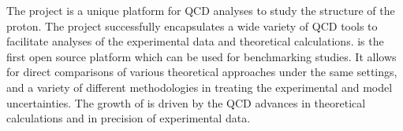 
\label{sec:summary}
The \fitter project is a unique platform for QCD analyses to study the 
structure of the proton.
The project successfully encapsulates a wide variety
of QCD tools to facilitate analyses of the experimental data
and theoretical calculations. \fitter is the first open source platform which can be used for benchmarking studies. 
It allows for direct comparisons of various theoretical approaches under the same settings, and a variety of 
different methodologies in treating  the experimental and model uncertainties. 
The growth of \fitter is driven by the QCD advances in theoretical calculations and in precision of experimental data.


